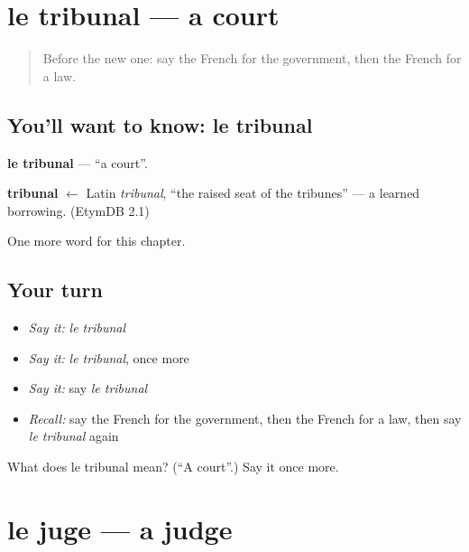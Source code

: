 \section[le tribunal]{le tribunal — a court}

\label{lesson:FR-C222-tribunal}



\begin{quote}
Before the new one: say the French for the government, then the French for a law.
\end{quote}

\subsection*{You'll want to know: le tribunal}
\textbf{le tribunal} — \textquotedblleft{}a court\textquotedblright{}.

\begin{cousinweb}
\textbf{tribunal} $\leftarrow$ Latin \emph{tribunal}, \textquotedblleft{}the raised seat of the tribunes\textquotedblright{} — a learned borrowing. (EtymDB 2.1)
\end{cousinweb}

\begin{grammarlens}[title={What you've built}]
One more word for this chapter.
\end{grammarlens}

\subsection*{Your turn}
\begin{itemize}
\raggedright
  \item \emph{Say it:} \emph{le tribunal}
  \item \emph{Say it:} \emph{le tribunal}, once more
  \item \emph{Say it:} say \emph{le tribunal}
  \item \emph{Recall:} say the French for the government, then the French for a law, then say \emph{le tribunal} again
\end{itemize}

\begin{tcolorbox}[breakable,colback=teal!4,colframe=teal!35!black,title={Before you move on}]
What does le tribunal mean? (\textquotedblleft{}A court\textquotedblright{}.) Say it once more.
\end{tcolorbox}
\section[le juge]{le juge — a judge}

